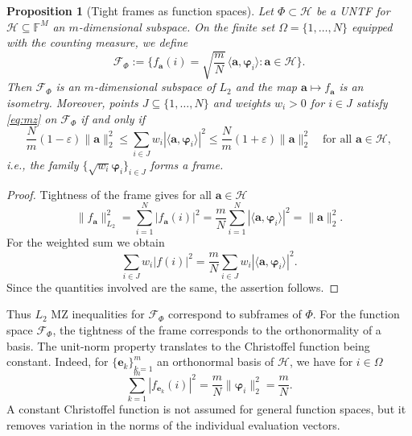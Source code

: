 \documentclass[a4paper]{amsart}
\numberwithin{equation}{section}
\newtheorem{proposition}[theorem]{Proposition}
\begin{document}
\begin{proposition}[Tight frames as function spaces]\label{framemz}
    Let $\Phi\subset\mathcal H$ be a UNTF for $\mathcal H\subseteq\mathds F^M$ an $m$-dimensional subspace.
    On the finite set $\Omega=\{1,\dots,N\}$ equipped with the counting measure, we define
    \begin{equation}\label{eq:framespace}
        \mathcal F_\Phi
        :=\Big\{
        f_{\bm a}(i)=\sqrt{\frac mN}\,
        \langle\bm a,\bm\varphi_i\rangle:
        \bm a\in\mathcal H
        \Big\}.
    \end{equation}
    Then $\mathcal F_\Phi$ is an $m$-dimensional subspace of $L_2$ and the map $\bm a\mapsto f_{\bm a}$ is an isometry.
    Moreover, points $J\subseteq\{1,\dots,N\}$ and weights $w_i>0$ for $i\in J$ satisfy \eqref{eq:mz} on $\mathcal F_\Phi$ if and only if
    \begin{equation}\label{eq:framesub}
        \frac Nm(1-\varepsilon)\|\bm a\|_2^2
        \le \sum_{i\in J}w_i|\langle\bm a,\bm\varphi_i\rangle|^2
        \le \frac Nm(1+\varepsilon)\|\bm a\|_2^2
        \quad\text{for all }\bm a\in\mathcal H,
    \end{equation}
    i.e., the family $\{\sqrt{w_i}\bm\varphi_i\}_{i\in J}$ forms a frame.
\end{proposition}

\begin{proof}
    Tightness of the frame gives for all $\bm a\in\mathcal H$
    \begin{equation*}
        \|f_{\bm a}\|_{L_2}^2
        = \sum_{i=1}^N|f_{\bm a}(i)|^2
        =\frac mN\sum_{i=1}^N
        |\langle\bm a,\bm\varphi_i\rangle|^2
        =\|\bm a\|_{2}^2.
    \end{equation*}
    For the weighted sum we obtain
    \begin{equation*}
        \sum_{i\in J}w_i|f(i)|^2
        = \frac mN \sum_{i\in J}w_i|\langle\bm a,\bm\varphi_i\rangle|^2 .
    \end{equation*}
    Since the quantities involved are the same, the assertion follows.
\end{proof}

Thus $L_2$ MZ inequalities for $\mathcal F_\Phi$ correspond to subframes of $\Phi$.
For the function space $\mathcal F_\Phi$, the tightness of the frame corresponds to the orthonormality of a basis.
The unit-norm property translates to the Christoffel function being constant.
Indeed, for $\{\bm e_k\}_{k=1}^{m}$ an orthonormal basis of $\mathcal H$, we have for $i\in\Omega$
\begin{equation*}
    \sum_{k=1}^{m} |f_{\bm e_k}(i)|^2
    = \frac mN \|\bm\varphi_i\|_2^2
    = \frac mN.
\end{equation*}
A constant Christoffel function is not assumed for general function spaces, but it removes variation in the norms of the individual evaluation vectors.
\end{document}
